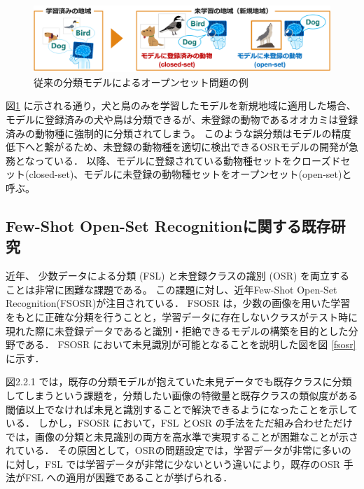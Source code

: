 \documentclass[a4paper,11pt,nomag]{jsreport}
\begin{document}
\begin{figure}[tbp]
  \centering
  \includegraphics[width=\linewidth, keepaspectratio]{image/non_osr.png}
  \caption{従来の分類モデルによるオープンセット問題の例}
  \label{fig:non_osr}
\end{figure}

図\ref{fig:non_osr} に示される通り，犬と鳥のみを学習したモデルを新規地域に適用した場合、モデルに登録済みの犬や鳥は分類できるが、未登録の動物であるオオカミは登録済みの動物種に強制的に分類されてしまう。
このような誤分類はモデルの精度低下へと繋がるため、未登録の動物種を適切に検出できるOSRモデルの開発が急務となっている．
以降、モデルに登録されている動物種セットをクローズドセット(closed-set)、モデルに未登録の動物種セットをオープンセット(open-set)と呼ぶ。


\subsection{Few-Shot Open-Set Recognitionに関する既存研究}

近年、
少数データによる分類 (FSL) と未登録クラスの識別 (OSR) を両立することは非常に困難な課題である。
この課題に対し、近年Few-Shot Open-Set Recognition(FSOSR)が注目されている．
FSOSR は，少数の画像を用いた学習をもとに正確な分類を行うことと，学習データに存在しないクラスがテスト時に現れた際に未登録データであると識別・拒絶できるモデルの構築を目的とした分野である．
FSOSR において未見識別が可能となることを説明した図を図 \ref{fsosr}に示す．


図2.2.1 では，既存の分類モデルが抱えていた未見データでも既存クラスに分類してしまうという課題を，分類したい画像の特徴量と既存クラスの類似度がある閾値以上でなければ未見と識別することで解決できるようになったことを示している．
しかし，FSOSR において，FSL とOSR の手法をただ組み合わせただけでは，画像の分類と未見識別の両方を高水準で実現することが困難なことが示されている\cite{peeler}．
その原因として，OSRの問題設定では，学習データが非常に多いのに対し，FSL では学習データが非常に少ないという違いにより，既存のOSR 手法がFSL への適用が困難であることが挙げられる．
\end{document}
